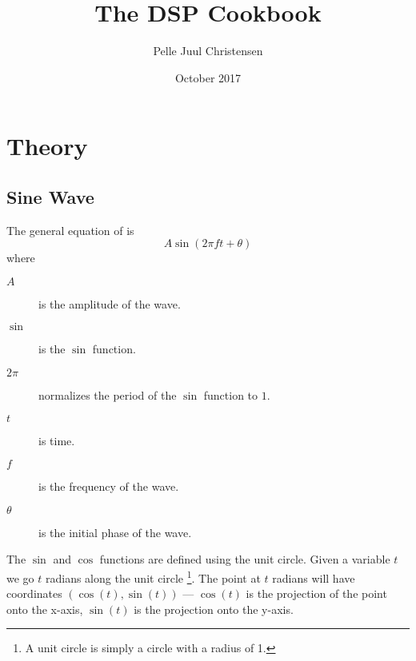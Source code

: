 \documentclass[11pt]{article}
\begin{document}
\title{The DSP Cookbook}
\date{October 2017}
\author{Pelle Juul Christensen}
\maketitle
\tableofcontents

\section{Theory}
\subsection{Sine Wave}

The general equation of is
\begin{equation}
    A\sin(2\pi f t + \theta)
\end{equation}
where
\begin{description}
    \item[$A$] is the amplitude of the wave.
    \item[$\sin$] is the $\sin$ function.
    \item[$2\pi$] normalizes the period of the $\sin$ function to $1$.
    \item[$t$] is time.
    \item[$f$] is the frequency of the wave.
    \item[$\theta$] is the initial phase of the wave.
\end{description}

The $\sin$ and $\cos$ functions are defined using the unit circle. Given a variable $t$ we go $t$ radians along the unit circle \footnote{A unit circle is simply a circle with a radius of 1.}. The point at $t$ radians will have coordinates $(\cos(t), \sin(t))$ --- $\cos(t)$ is the projection of the point onto the x-axis, $\sin(t)$ is the projection onto the y-axis.

\begin{figure}[h]
\centering
{}
\end{figure}
\end{document}
